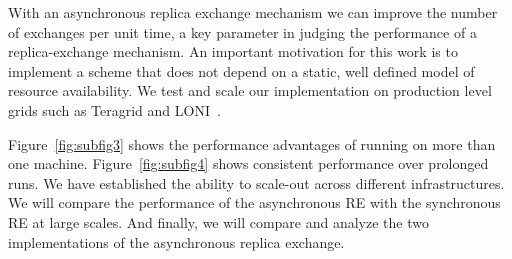 \documentclass[a4paper,10pt]{article}
\newcommand{\jhanote}[1]{ {\textcolor{red} { ***shantenu: #1 }}}
\newcommand{\athotanote}[1]{ {\textcolor{green} { ***athota: #1 }}}
\newcommand{\jhanote}[1]{}
\newcommand{\athotanote}[1]{}
\begin{document}
%

With an asynchronous replica exchange mechanism we can improve the
number of exchanges per unit time, a key parameter in judging the
performance of a replica-exchange mechanism.  An important motivation
for this work is to implement a scheme that does not depend on a
static, well defined model of resource availability. We test and scale
our implementation on production level grids such as Teragrid and
LONI~\cite{LONI_web}.

 
Figure~\ref{fig:subfig3} shows the performance advantages of running on more than one machine. Figure~\ref{fig:subfig4} shows consistent performance over prolonged runs.
We have established the ability to scale-out across different
infrastructures. We will compare the performance of the asynchronous
RE with the synchronous RE at large scales. And finally, we will
compare and analyze the two implementations of the asynchronous
replica exchange.


 
  
 
\end{document}
